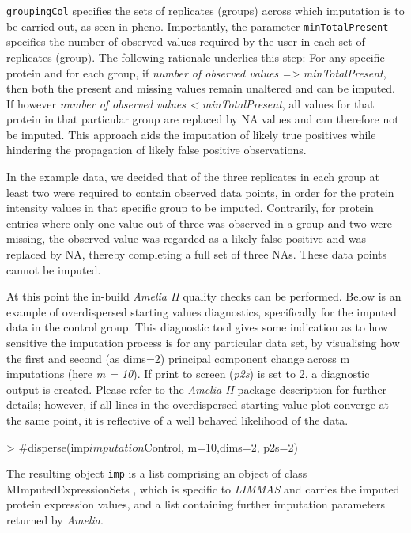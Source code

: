 \documentclass[a4paper,11pt]{article}
\newcommand{\Robject}[1]{{\texttt{#1}}}
\newcommand{\Rpackage}[1]{\textit{#1}}
\begin{document}
\Robject{groupingCol} specifies the sets of replicates (groups) across which imputation is to be carried out, as seen in pheno. Importantly, the parameter \Robject{minTotalPresent} specifies the number of observed values required by the user in each set of replicates (group). The following rationale underlies this step: For any specific protein and for each group, if \emph{number of observed values => minTotalPresent}, then both the present and missing values remain unaltered and can be imputed. If however \emph{number of observed values < minTotalPresent}, all values for that protein in that particular group are replaced by NA values and can therefore not be imputed. This approach aids the imputation of likely true positives while hindering the propagation of likely false positive observations.

In the example data, we decided that of the three replicates in each group at least two were required to contain observed data points, in order for the protein intensity values in that specific group to be imputed. Contrarily, for protein entries where only one value out of three was observed in a group and two were missing, the observed value was regarded as a likely false positive and was replaced by NA, thereby completing a full set of three NAs. These data points cannot be imputed.

At this point the in-build \Rpackage{Amelia II} quality checks can be performed. Below is an example of overdispersed starting values diagnostics, specifically for the imputed data in the control group. This diagnostic tool gives some indication as to how sensitive the imputation process is for any particular data set, by visualising how the first and second (as dims=2) principal component change across m imputations (here \emph{m = 10}). If print to screen (\emph{p2s}) is set to 2, a diagnostic output is created. Please refer to the \Rpackage{Amelia II} package description for further details; however, if all lines in the overdispersed starting value plot converge at the same point, it is reflective of a well behaved likelihood of the data.

\begin{Schunk}
\begin{Sinput}
> #disperse(imp$imputation$Control, m=10,dims=2, p2s=2)
\end{Sinput}
\end{Schunk}

The resulting object \Robject{imp} is a list comprising an object of class MImputedExpressionSets , which is specific to \Rpackage{LIMMAS} and carries the imputed protein expression values, and a list containing further imputation parameters returned by \Rpackage{Amelia}.
\end{document}
